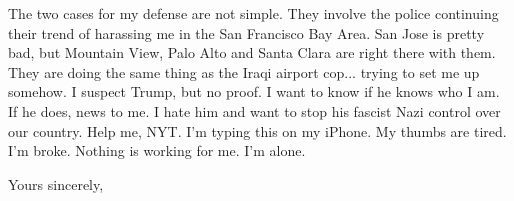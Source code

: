 \documentclass[a4paper]{arthur-letter}
\begin{document}
\begin{letter}
            The two cases for my defense are not simple. They involve the police continuing their trend of harassing me in the San Francisco Bay Area. San Jose is pretty bad, but Mountain View, Palo Alto and Santa Clara are right there with them. They are doing the same thing as the Iraqi airport cop... trying to set me up somehow. I suspect Trump, but no proof. I want to know if he knows who I am. If he does, news to me. I hate him and want to stop his fascist Nazi control over our country. Help me, NYT. I'm typing this on my iPhone. My thumbs are tired. I'm broke. Nothing is working for me. I'm alone. 

            \closing{Yours sincerely,} %


    \end{letter}
\end{document}
